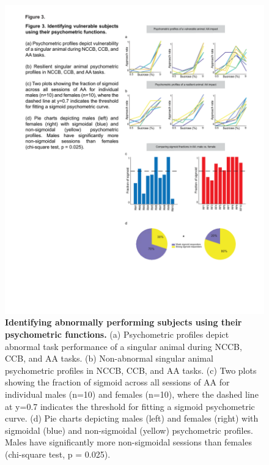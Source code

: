 \documentclass{article}
\begin{document}
\begin{figure}[H] %
  \centering
  \includegraphics[width=\textwidth, trim=50 100 50 100]{Figs/Alcohol_main_3.pdf}
  \caption{\textbf{Identifying abnormally performing subjects using their psychometric functions.} (a) Psychometric profiles depict abnormal task performance of a singular animal during NCCB, CCB, and AA tasks. (b) Non-abnormal singular animal psychometric profiles in NCCB, CCB, and AA tasks. (c) Two plots showing the fraction of sigmoid across all sessions of AA for individual males (n=10) and females (n=10), where the dashed line at y=0.7 indicates the threshold for fitting a sigmoid psychometric curve. (d) Pie charts depicting males (left) and females (right) with sigmoidal (blue) and non-sigmoidal (yellow) psychometric profiles. Males have significantly more non-sigmoidal sessions than females (chi-square test, p = 0.025).}
  \label{fig:alcohol_main_3}
\end{figure}

\vspace{1em}
\end{document}
